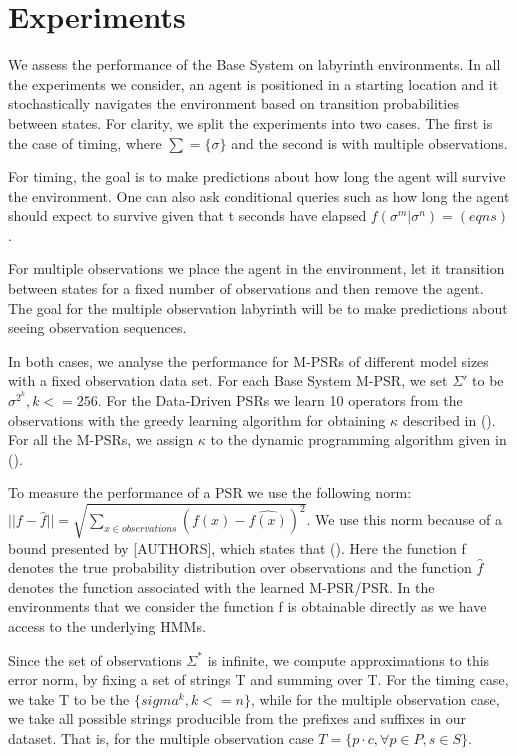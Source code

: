 \section{Experiments}

We assess the performance of the Base System on labyrinth environments. In all the experiments we consider, an agent is positioned in a starting location and it stochastically navigates the environment based on transition probabilities between states. For clarity, we split the experiments into two cases. The first is the case of timing, where $\sum = \{\sigma\}$ and the second is with multiple observations.

For timing, the goal is to make predictions about how long the agent will survive the environment. One can also ask conditional queries such as how long the agent should expect to survive given that t seconds have elapsed $f(\sigma^m|\sigma^n) = (eqns)$. 

For multiple observations we place the agent in the environment, let it transition between states for a fixed number of observations and then remove the agent. The goal for the multiple observation labyrinth will be to make predictions about seeing observation sequences. 

In both cases, we analyse the performance for M-PSRs of different model sizes with a fixed observation data set. For each Base System M-PSR, we set $\Sigma'$ to be {$\sigma^{2^k}, k<=256 $}. For the Data-Driven PSRs we learn 10 operators from the observations with the greedy learning algorithm for obtaining $\kappa$ described in (). For all the M-PSRs, we assign $\kappa$ to the dynamic programming algorithm given in (). 

To measure the performance of a PSR we use the following norm:
$||f - \hat{f}|| = \sqrt{\sum\nolimits_{x \in observations}(f(x) - \hat{f(x)})^2}$. We use this norm because of a bound presented by [AUTHORS], which states that (). Here the function f denotes the true probability distribution over observations and the function $\hat{f}$ denotes the function associated with the learned M-PSR/PSR. In the environments that we consider the function f is obtainable directly as we have access to the underlying HMMs.

Since the set of observations $\Sigma^*$ is infinite, we compute approximations to this error norm, by fixing a set of strings T and summing over T. For the timing case, we take T to be the $\{sigma^k, k<=n\}$, while for the multiple observation case, we take all possible strings producible from the prefixes and suffixes in our dataset. That is, for the multiple observation case $T = \{p \cdot c, \forall p \in P, s \in S\}$.

